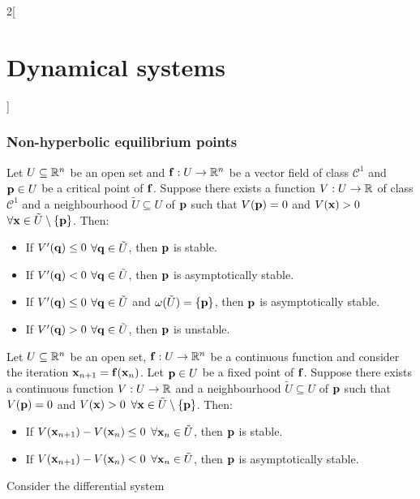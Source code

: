 \documentclass[../../../main_math.tex]{subfiles}
\begin{document}
\begin{multicols}{2}[\section{Dynamical systems}]
  \subsubsection{Non-hyperbolic equilibrium points}
  \begin{theorem}
    Let $U\subseteq \mathbb{R}^n$ be an open set and $\boldsymbol{\mathrm{f}}:U\rightarrow\mathbb{R}^n$ be a vector field of class $\mathcal{C}^1$ and $\boldsymbol{\mathrm{p}}\in U$ be a critical point of $\boldsymbol{\mathrm{f}}$. Suppose there exists a function $V:U\rightarrow\mathbb{R}$ of class $\mathcal{C}^1$ and a neighbourhood $\tilde{U}\subseteq U$ of $\boldsymbol{\mathrm{p}}$ such that $V(\boldsymbol{\mathrm{p}})=0$ and $V(\boldsymbol{\mathrm{x}})>0$ $\forall \boldsymbol{\mathrm{x}}\in\tilde{U}\setminus\{\boldsymbol{\mathrm{p}}\}$. Then:
    \begin{itemize}
      \item If $V'(\boldsymbol{\mathrm{q}})\leq 0$ $\forall \boldsymbol{\mathrm{q}}\in \tilde{U}$, then $\boldsymbol{\mathrm{p}}$ is stable.
      \item If $V'(\boldsymbol{\mathrm{q}})< 0$ $\forall \boldsymbol{\mathrm{q}}\in \tilde{U}$, then $\boldsymbol{\mathrm{p}}$ is asymptotically stable.
      \item If $V'(\boldsymbol{\mathrm{q}})\leq 0$ $\forall \boldsymbol{\mathrm{q}}\in \tilde{U}$ and $\omega(\tilde{U})=\{\boldsymbol{\mathrm{p}}\}$, then $\boldsymbol{\mathrm{p}}$ is asymptotically stable.
      \item If $V'(\boldsymbol{\mathrm{q}})> 0$ $\forall \boldsymbol{\mathrm{q}}\in \tilde{U}$, then $\boldsymbol{\mathrm{p}}$ is unstable.
    \end{itemize}
  \end{theorem}
  \begin{theorem}
    Let $U\subseteq \mathbb{R}^n$ be an open set, $\boldsymbol{\mathrm{f}}:U\rightarrow\mathbb{R}^n$ be a continuous function and consider the iteration $\boldsymbol{\mathrm{x}}_{n+1}=\boldsymbol{\mathrm{f}}(\boldsymbol{\mathrm{x}}_n)$. Let $\boldsymbol{\mathrm{p}}\in U$ be a fixed point of $\boldsymbol{\mathrm{f}}$. Suppose there exists a continuous function $V:U\rightarrow\mathbb{R}$ and a neighbourhood $\tilde{U}\subseteq U$ of $\boldsymbol{\mathrm{p}}$ such that $V(\boldsymbol{\mathrm{p}})=0$ and $V(\boldsymbol{\mathrm{x}})>0$ $\forall \boldsymbol{\mathrm{x}}\in\tilde{U}\setminus\{\boldsymbol{\mathrm{p}}\}$. Then:
    \begin{itemize}
      \item If $V(\boldsymbol{\mathrm{x}}_{n+1})-V(\boldsymbol{\mathrm{x}}_{n})\leq 0$ $\forall \boldsymbol{\mathrm{x}}_{n}\in \tilde{U}$, then $\boldsymbol{\mathrm{p}}$ is stable.
      \item If $V(\boldsymbol{\mathrm{x}}_{n+1})-V(\boldsymbol{\mathrm{x}}_{n})< 0$ $\forall  \boldsymbol{\mathrm{x}}_{n}\in \tilde{U}$, then $\boldsymbol{\mathrm{p}}$ is asymptotically stable.
    \end{itemize}
  \end{theorem}
  \begin{theorem}\label{DS:thmA}
    Consider the differential system
    $$
$$
\end{theorem}
\end{multicols}
\end{document}
